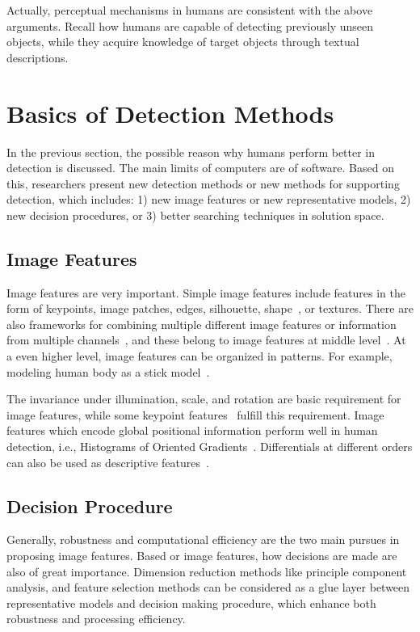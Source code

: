 Actually, perceptual mechanisms in humans are consistent with the above arguments. Recall how humans are capable of detecting previously unseen objects, while they acquire knowledge of target objects through textual descriptions.

\section{Basics of Detection Methods}

In the previous section, the possible reason why humans perform better in detection is discussed. The main limits of computers are of software. Based on this, researchers present new detection methods or new methods for supporting detection, which includes: 1) new image features or new representative models, 2) new decision procedures, or 3) better searching techniques in solution space.
\subsection{Image Features}
Image features are very important. Simple image features include features in the form of keypoints, image patches, edges,  silhouette, shape~\citep{scontext}, or textures. There are also frameworks for combining multiple different image features or information from multiple channels~\citep{regionc,bgf,lbp,lss}, and these belong to image features at middle level~\citep{midf}. At a even higher level, image features can be  organized in patterns. For example, modeling human body as a stick model~\citep{stickb}.

The invariance under illumination, scale, and rotation are basic requirement for image features, while some keypoint features~\citep{ij2,o12,o14,o15,o2} fulfill this requirement. Image features which encode global positional information perform well in human detection, i.e., Histograms of Oriented
Gradients~\citep{ij4}. Differentials at different orders can also be used as descriptive features~\citep{regionc}.



\subsection{Decision Procedure}
Generally, robustness and computational efficiency are the two main pursues in proposing image features. Based or image features, how decisions are made are also of great importance. Dimension reduction methods like principle component analysis, and feature selection methods can be considered as a glue layer between representative models and decision making procedure, which enhance both robustness and processing efficiency.

